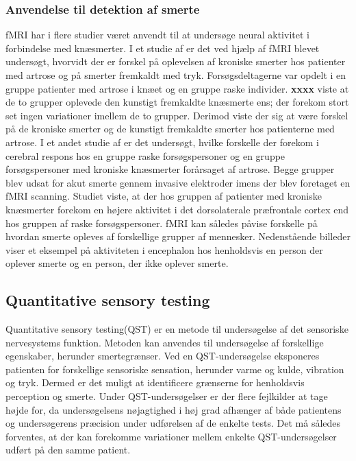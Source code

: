 \subsubsection{Anvendelse til detektion af smerte}
fMRI har i flere studier været anvendt til at undersøge neural aktivitet i forbindelse med knæsmerter.
I et studie af \citep{Parks2012} er det ved hjælp af fMRI blevet undersøgt, hvorvidt der er forskel på oplevelsen af kroniske smerter hos patienter med artrose og på smerter fremkaldt med tryk. Forsøgsdeltagerne var opdelt i en gruppe patienter med artrose i knæet og en gruppe raske individer. \textbf{xxxx} viste at de to grupper oplevede den kunstigt fremkaldte knæsmerte ens; der forekom stort set ingen variationer imellem de to grupper. Derimod viste der sig at være forskel på de kroniske smerter og de kunstigt fremkaldte smerter hos patienterne med artrose. \citep{Parks2012} 
I et andet studie af \citep{Hiramatsu2014} er det undersøgt, hvilke forskelle der forekom i cerebral respons hos en gruppe raske forsøgspersoner og en gruppe forsøgspersoner med kroniske knæsmerter forårsaget af artrose. Begge grupper blev udsat for akut smerte gennem invasive elektroder imens der blev foretaget en fMRI scanning. Studiet viste, at der hos gruppen af patienter med kroniske knæsmerter forekom en højere aktivitet i det dorsolaterale præfrontale cortex end hos gruppen af raske forsøgspersoner. \citep{Hiramatsu2014} 
fMRI kan således påvise forskelle på hvordan smerte opleves af forskellige grupper af mennesker. Nedenstående billeder viser et eksempel på aktiviteten i encephalon hos henholdsvis en person der oplever smerte og en person, der ikke oplever smerte. 

\subsection{Quantitative sensory testing}
Quantitative sensory testing(QST) er en metode til undersøgelse af det sensoriske nervesystems funktion. Metoden kan anvendes til undersøgelse af forskellige egenskaber, herunder smertegrænser. Ved en QST-undersøgelse eksponeres patienten for forskellige sensoriske sensation, herunder varme og kulde, vibration og tryk. Dermed er det muligt at identificere grænserne for henholdsvis perception og smerte. Under QST-undersøgelser er der flere fejlkilder at tage højde for, da undersøgelsens nøjagtighed i høj grad afhænger af både patientens og undersøgerens præcision under udførelsen af de enkelte tests. Det må således forventes, at der kan forekomme variationer mellem enkelte QST-undersøgelser udført på den samme patient. \citep{Yarnitsky2006}

